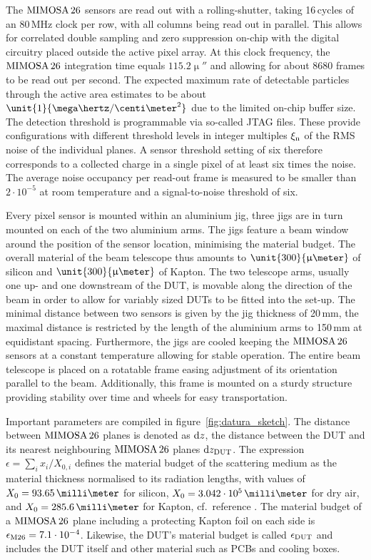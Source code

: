 The $\textrm{MIMOSA\,26}$ sensors are read out with a rolling-shutter, taking 16\,cycles of an 80\,MHz clock per row, with all columns being read out in parallel. 
This allows for correlated double sampling and zero suppression on-chip with the digital circuitry placed outside the active pixel array. 
At this clock frequency, the $\textrm{MIMOSA\,26}$ integration time equals $\unit{115.2}{\upmu\second}$ and allowing for about 8680 frames to be read out per second. 
The expected maximum rate of detectable particles through the active area estimates to be about $\unit{1}{\mega\hertz/\centi\meter^2}$ due to the limited on-chip buffer size. 
The detection threshold is programmable via so-called JTAG files. 
These provide configurations with different threshold levels in integer multiples $\xi_{\textrm{n}}$ of the RMS noise of the individual planes. 
A sensor threshold setting of six therefore corresponds to a collected charge in a single pixel of at least six times the noise. 
The average noise occupancy per read-out frame is measured to be smaller than $2\cdot10^{-5}$ at room temperature and a signal-to-noise threshold of six.

Every pixel sensor is mounted within an aluminium jig, three jigs are in turn mounted on each of the two aluminium arms. 
The jigs feature a beam window around the position of the sensor location, minimising the material budget. 
The overall material of the beam telescope thus amounts to $\unit{300}{\upmu\meter}$ of silicon and $\unit{300}{\upmu\meter}$ of Kapton. 
The two telescope arms, usually one up- and one downstream of the DUT, is movable along the direction of the beam in order to allow for variably sized DUTs to be fitted into the set-up. 
The minimal distance between two sensors is given by the jig thickness of 20\,mm, the maximal distance is restricted by the length of the aluminium arms to 150\,mm at equidistant spacing.
Furthermore, the jigs are cooled keeping the $\textrm{MIMOSA\,26}$ sensors at a constant temperature allowing for stable operation.
The entire beam telescope is placed on a rotatable frame easing adjustment of its orientation parallel to the beam. 
Additionally, this frame is mounted on a sturdy structure providing stability over time and wheels for easy transportation. 

Important parameters are compiled in figure~\ref{fig:datura_sketch}. 
The distance between $\textrm{MIMOSA\,26}$ planes is denoted as $\textrm{d}z$, the distance between the DUT and its nearest neighbouring $\textrm{MIMOSA\,26}$ planes $\textrm{d}z_{\textrm{DUT}}$. 
The expression $\epsilon = \sum_i x_{i}/X_{0,i}$ defines the material budget of the scattering medium as the material thickness normalised to its radiation lengths,
 with values of $X_0 = 93.65\,\milli\meter$ for silicon, $X_0 = 3.042\cdot 10^{5}\,\milli\meter$ for dry air, and $X_0 = 285.6\,\milli\meter$ for Kapton, cf.~reference \cite{ref:x0values}.
The material budget of a $\textrm{MIMOSA\,26}$ plane including a protecting Kapton foil on each side is $\mathnormal{\epsilon_{\textrm{M26}}} = 7.1\cdot10^{-4}$. 
Likewise, the DUT's material budget is called $\mathnormal{\epsilon_{\textrm{DUT}}}$ and includes the DUT itself and other material such as PCBs and cooling boxes.


